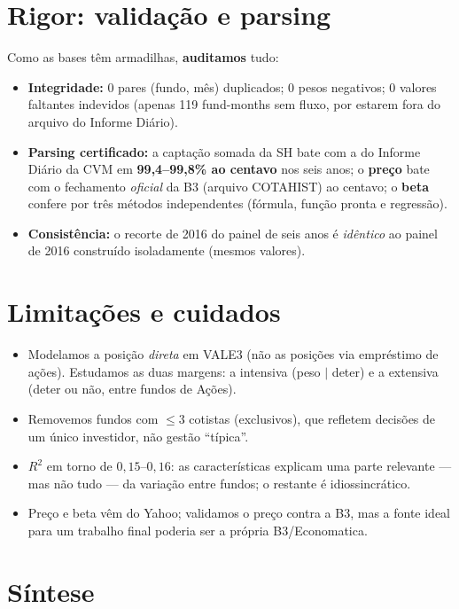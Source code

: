 \documentclass[11pt]{article}
\begin{document}
\section{Rigor: validação e parsing}\label{sec:valid}

Como as bases têm armadilhas, \textbf{auditamos} tudo:
\begin{itemize}[noitemsep]
\item \textbf{Integridade:} 0 pares (fundo, mês) duplicados; 0 pesos negativos; 0
valores faltantes indevidos (apenas 119 fund-months sem fluxo, por estarem fora do
arquivo do Informe Diário).
\item \textbf{Parsing certificado:} a captação somada da SH bate com a do Informe
Diário da CVM em \textbf{99,4--99,8\% ao centavo} nos seis anos; o \textbf{preço} bate
com o fechamento \emph{oficial} da B3 (arquivo COTAHIST) ao centavo; o \textbf{beta}
confere por três métodos independentes (fórmula, função pronta e regressão).
\item \textbf{Consistência:} o recorte de 2016 do painel de seis anos é
\emph{idêntico} ao painel de 2016 construído isoladamente (mesmos valores).
\end{itemize}

\section{Limitações e cuidados}

\begin{itemize}[noitemsep]
\item Modelamos a posição \emph{direta} em VALE3 (não as posições via empréstimo de
ações). Estudamos as duas margens: a intensiva (peso $|$ deter) e a extensiva (deter
ou não, entre fundos de Ações).
\item Removemos fundos com $\le 3$ cotistas (exclusivos), que refletem decisões de um
único investidor, não gestão ``típica''.
\item $R^2$ em torno de $0{,}15$--$0{,}16$: as características explicam uma parte
relevante --- mas não tudo --- da variação entre fundos; o restante é idiossincrático.
\item Preço e beta vêm do Yahoo; validamos o preço contra a B3, mas a fonte ideal para
um trabalho final poderia ser a própria B3/Economatica.
\end{itemize}

\section{Síntese}
\end{document}
